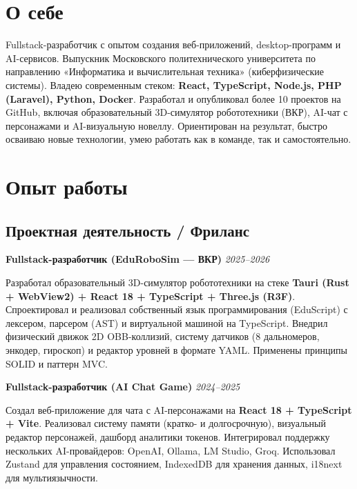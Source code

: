 \documentclass[10pt,a4paper]{article}
\newcommand{\projectEntry}[3]{\textbf{#1} \hfill \textit{#2}\par #3\par\vspace{0.3em}}
\begin{document}

\section{О себе}

Fullstack-разработчик с опытом создания веб-приложений, desktop-программ и AI-сервисов. Выпускник Московского политехнического университета по направлению «Информатика и вычислительная техника» (киберфизические системы). Владею современным стеком: \textbf{React, TypeScript, Node.js, PHP (Laravel), Python, Docker}. Разработал и опубликовал более 10 проектов на GitHub, включая образовательный 3D-симулятор робототехники (ВКР), AI-чат с персонажами и AI-визуальную новеллу. Ориентирован на результат, быстро осваиваю новые технологии, умею работать как в команде, так и самостоятельно.

\section{Опыт работы}

\subsection{Проектная деятельность / Фриланс}

\projectEntry{Fullstack-разработчик (EduRoboSim — ВКР)}{2025--2026}
{Разработал образовательный 3D-симулятор робототехники на стеке \textbf{Tauri (Rust + WebView2) + React 18 + TypeScript + Three.js (R3F)}. Спроектировал и реализовал собственный язык программирования (EduScript) с лексером, парсером (AST) и виртуальной машиной на TypeScript. Внедрил физический движок 2D OBB-коллизий, систему датчиков (8 дальномеров, энкодер, гироскоп) и редактор уровней в формате YAML. Применены принципы SOLID и паттерн MVC.}

\projectEntry{Fullstack-разработчик (AI Chat Game)}{2024--2025}
{Создал веб-приложение для чата с AI-персонажами на \textbf{React 18 + TypeScript + Vite}. Реализовал систему памяти (кратко- и долгосрочную), визуальный редактор персонажей, дашборд аналитики токенов. Интегрировал поддержку нескольких AI-провайдеров: OpenAI, Ollama, LM Studio, Groq. Использовал Zustand для управления состоянием, IndexedDB для хранения данных, i18next для мультиязычности.}
\end{document}
